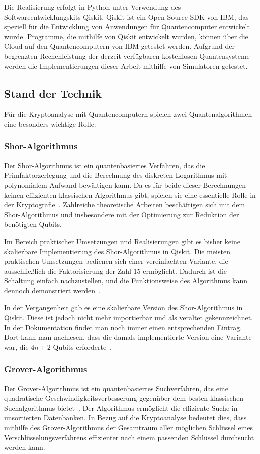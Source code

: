 \documentclass[a4paper,journal]{IEEEtran}
\begin{document}
Die Realisierung erfolgt in Python unter Verwendung des Softwareentwicklungskits Qiskit.
Qiskit ist ein Open-Source-SDK von IBM,
das speziell für die Entwicklung von Anwendungen für Quantencomputer entwickelt wurde.
Programme, die mithilfe von Qiskit entwickelt wurden,
können über die Cloud auf den Quantencomputern von IBM getestet werden.
Aufgrund der begrenzten Rechenleistung der derzeit verfügbaren kostenlosen Quantensysteme
werden die Implementierungen dieser Arbeit mithilfe von Simulatoren getestet.

\subsection{Stand der Technik}

Für die Kryptoanalyse mit Quantencomputern spielen zwei Quantenalgorithmen eine besonders wichtige Rolle:

\subsubsection{Shor-Algorithmus}
Der Shor-Algorithmus ist ein quantenbasiertes Verfahren,
das die Primfaktorzerlegung und die Berechnung des diskreten Logarithmus
mit polynomialem Aufwand bewältigen kann.
Da es für beide dieser Berechnungen keinen effizienten klassischen Algorithmus gibt,
spielen sie eine essentielle Rolle in der Kryptografie~\cite{Shor:1997}.
Zahlreiche theoretische Arbeiten beschäftigen sich mit dem Shor-Algorithmus und
insbesondere mit der Optimierung zur Reduktion der benötigten Qubits.

Im Bereich praktischer Umsetzungen und Realisierungen
gibt es bisher keine skalierbare Implementierung des Shor-Algorithmus in Qiskit.
Die meisten praktischen Umsetzungen bedienen sich einer vereinfachten Variante,
die ausschließlich die Faktorisierung der Zahl 15 ermöglicht.
Dadurch ist die Schaltung einfach nachzustellen,
und die Funktionsweise des Algorithmus kann dennoch demonstriert werden~\cite{9376169, Monz_2016, IBM:Shor}.

In der Vergangenheit gab es eine skalierbare Version des Shor-Algorithmus in Qiskit.
Diese ist jedoch nicht mehr importierbar und als veraltet gekennzeichnet.
In der Dokumentation findet man noch immer einen entsprechenden Eintrag.
Dort kann man nachlesen, dass die damals implementierte Version eine Variante war,
die \(4n+2\) Qubits erforderte~\cite{IBM:Shor_docu}.

\subsubsection{Grover-Algorithmus}
Der Grover-Algorithmus ist ein quantenbasiertes Suchverfahren,
das eine quadratische Geschwindigkeitsverbesserung
gegenüber dem besten klassischen Suchalgorithmus bietet~\cite{grover1996fast}.
Der Algorithmus ermöglicht die effiziente Suche in unsortierten Datenbanken.
In Bezug auf die Kryptoanalyse bedeutet dies,
dass mithilfe des Grover-Algorithmus der Gesamtraum aller möglichen Schlüssel
eines Verschlüsselungsverfahrens effizienter nach einem passenden Schlüssel durchsucht werden kann.
\end{document}
